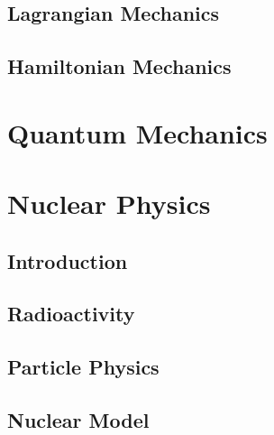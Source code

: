 \documentclass[10pt]{report}
\begin{document}
\section*{Lagrangian Mechanics}
\clearpage
\clearpage

\section*{Hamiltonian Mechanics}
\clearpage
\clearpage

\chapter*{Quantum Mechanics}
\clearpage
\clearpage

\chapter*{Nuclear Physics}
\section*{Introduction}
\clearpage

\section*{Radioactivity}
\clearpage

\section*{Particle Physics}
\clearpage

\section*{Nuclear Model}

\end{document}
